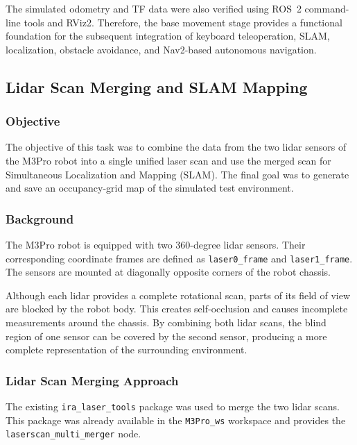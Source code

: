 \documentclass{article}
\begin{document}
The simulated odometry and TF data were also verified using ROS~2 command-line tools and RViz2. Therefore, the base movement stage provides a functional foundation for the subsequent integration of keyboard teleoperation, SLAM, localization, obstacle avoidance, and Nav2-based autonomous navigation.



\subsection{Lidar Scan Merging and SLAM Mapping}

\subsubsection{Objective}

The objective of this task was to combine the data from the two lidar sensors of the M3Pro robot into a single unified laser scan and use the merged scan for Simultaneous Localization and Mapping (SLAM). The final goal was to generate and save an occupancy-grid map of the simulated test environment.

\subsubsection{Background}

The M3Pro robot is equipped with two 360-degree lidar sensors. Their corresponding coordinate frames are defined as \texttt{laser0\_frame} and \texttt{laser1\_frame}. The sensors are mounted at diagonally opposite corners of the robot chassis.

Although each lidar provides a complete rotational scan, parts of its field of view are blocked by the robot body. This creates self-occlusion and causes incomplete measurements around the chassis. By combining both lidar scans, the blind region of one sensor can be covered by the second sensor, producing a more complete representation of the surrounding environment.

\subsubsection{Lidar Scan Merging Approach}

The existing \texttt{ira\_laser\_tools} package was used to merge the two lidar scans. This package was already available in the \texttt{M3Pro\_ws} workspace and provides the \texttt{laserscan\_multi\_merger} node.
\end{document}

